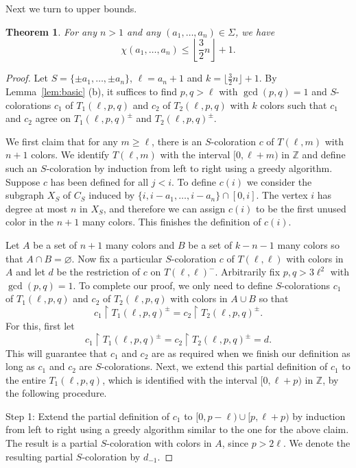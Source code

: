 \documentclass[11pt]{amsart}
\newtheorem{theorem}{Theorem}[section]
\theoremstyle{definition}
\def\Z{\mathbb{Z}}
\def\Z{\mathbb{Z}}
\begin{document}
Next we turn to upper bounds.

\begin{theorem} For any $n>1$ and any $(a_1,\dots, a_n)\in \Sigma$, we have
$$ \chi(a_1,\dots, a_n)\leq \left\lfloor \displaystyle\frac{3}{2}n\right\rfloor +1. $$
\end{theorem}

\begin{proof} Let $S=\{\pm a_1, \dots, \pm a_n\}$, $\ell=a_n+1$ and $k=\lfloor \frac{3}{2}n\rfloor +1$. By Lemma~\ref{lem:basic} (b), it suffices to find $p, q>\ell$ with $\gcd(p, q)=1$ and $S$-colorations $c_1$ of $T_1(\ell, p, q)$ and $c_2$ of $T_2(\ell, p, q)$ with $k$ colors such that $c_1$ and $c_2$ agree on $T_1(\ell, p, q)^{\pm}$ and $T_2(\ell, p, q)^{\pm}$.

We first claim that for any $m\geq \ell$, there is an $S$-coloration $c$ of $T(\ell, m)$ with $n+1$ colors. We identify $T(\ell, m)$ with the interval $[0, \ell+m)$ in $\Z$ and define such an $S$-coloration by induction from left to right using a greedy algorithm. Suppose $c$ has been defined for all $j<i$. To define $c(i)$ we consider the subgraph $X_S$ of $C_S$ induced by $\{i, i-a_1,\dots, i-a_n\}\cap [0,i]$. The vertex $i$ has degree at most $n$ in $X_S$, and therefore we can assign $c(i)$ to be the first unused color in the $n+1$ many colors. This finishes the definition of $c(i)$. 

Let $A$ be a set of $n+1$ many colors and $B$ be a set of $k-n-1$ many colors so that $A\cap B=\varnothing$. Now fix a particular $S$-coloration $c$ of $T(\ell, \ell)$ with colors in $A$ and let $d$ be the restriction of $c$ on $T(\ell, \ell)^-$. 
Arbitrarily fix $p, q>3\ell^2$ with $\gcd(p, q)=1$. To complete our proof, we only need to define $S$-colorations $c_1$ of $T_1(\ell, p, q)$ and $c_2$ of $T_2(\ell, p, q)$ with colors in $A\cup B$ so that
$$ c_1\upharpoonright T_1(\ell, p, q)^{\pm}=c_2\upharpoonright T_2(\ell, p, q)^{\pm}. $$
For this, first let 
$$ c_1\upharpoonright T_1(\ell, p, q)^{\pm}=c_2\upharpoonright T_2(\ell, p, q)^{\pm}=d. $$
This will guarantee that $c_1$ and $c_2$ are as required when we finish our definition as long as $c_1$ and $c_2$ are $S$-colorations. Next, we extend this partial definition of $c_1$ to the entire $T_1(\ell, p, q)$, which is identified with the interval $[0, \ell+p)$ in $\Z$, by the following procedure. 

Step 1: Extend the partial definition of $c_1$ to $[0, p-\ell)\cup [p, \ell+p)$ by induction from left to right using a greedy algorithm similar to the one for the above claim. The result is a partial $S$-coloration with colors in $A$, since $p>2\ell$. We denote the resulting partial $S$-coloration by $d_{-1}$. 


\end{proof}
\end{document}
